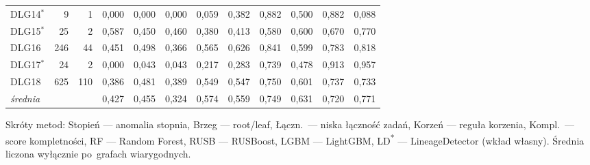 \begin{table}[ht]
\begin{tabular}{lrrccccccccc}
DLG14$^{*}$ & 9 & 1 & 0{,}000 & 0{,}000 & 0{,}000 & 0{,}059 & 0{,}382 & 0{,}882 & 0{,}500 & 0{,}882 & 0{,}088 \\
DLG15$^{*}$ & 25 & 2 & 0{,}587 & 0{,}450 & 0{,}460 & 0{,}380 & 0{,}413 & 0{,}580 & 0{,}600 & 0{,}670 & 0{,}770 \\
DLG16 & 246 & 44 & 0{,}451 & 0{,}498 & 0{,}366 & 0{,}565 & 0{,}626 & 0{,}841 & 0{,}599 & 0{,}783 & 0{,}818 \\
DLG17$^{*}$ & 24 & 2 & 0{,}000 & 0{,}043 & 0{,}043 & 0{,}217 & 0{,}283 & 0{,}739 & 0{,}478 & 0{,}913 & 0{,}957 \\
DLG18 & 625 & 110 & 0{,}386 & 0{,}481 & 0{,}389 & 0{,}549 & 0{,}547 & 0{,}750 & 0{,}601 & 0{,}737 & 0{,}733 \\
\midrule
\emph{średnia} & & & 0{,}427 & 0{,}455 & 0{,}324 & 0{,}574 & 0{,}559 & 0{,}749 & 0{,}631 & 0{,}720 & 0{,}771 \\
\bottomrule
\end{tabular}

\vspace{0.4em}
\footnotesize Skróty metod: Stopień — anomalia stopnia, Brzeg — root/leaf, Łączn.\ — niska łączność zadań, Korzeń — reguła korzenia, Kompl.\ — score kompletności, RF — Random Forest, RUSB — RUSBoost, LGBM — LightGBM, LD\textsuperscript{*} — LineageDetector (wkład własny). Średnia liczona wyłącznie po~grafach wiarygodnych.
\end{table}

\clearpage

